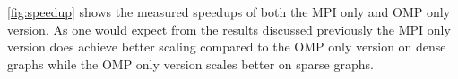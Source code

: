\autoref{fig:speedup} shows the measured speedups of both the MPI only and OMP only version. As one would expect from the results discussed previously the MPI only version does achieve better scaling compared to the OMP only version on dense graphs while the OMP only version scales better on sparse graphs.

